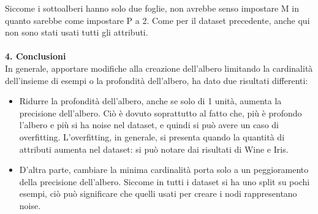 \documentclass{article}
\begin{document}
Siccome i sottoalberi hanno solo due foglie, non avrebbe senso impostare M in quanto sarebbe come impostare P a 2.
Come per il dataset precedente, anche qui non sono stati usati tutti gli attributi.\\
\\
{\Large \textbf{{\large{4}}. Conclusioni}}\\
In generale, apportare modifiche alla creazione dell'albero limitando la cardinalità dell'insieme di esempi o la profondità dell'albero, ha dato due risultati differenti:
\begin{itemize}
	\item Ridurre la profondità dell'albero, anche se solo di 1 unità, aumenta la precisione dell'albero. Ciò è dovuto soprattutto al fatto che, più è profondo l'albero e più si ha noise nel dataset, e quindi si può avere un caso di overfitting. L'overfitting, in generale, si presenta quando la quantità di attributi aumenta nel dataset: si può notare dai risultati di Wine e Iris.
	\item D'altra parte, cambiare la minima cardinalità porta solo a un peggioramento della precisione dell'albero. Siccome in tutti i dataset si ha uno split su pochi esempi, ciò può significare che quelli usati per creare i nodi rappresentano noise.
\end{itemize}
\end{document}
